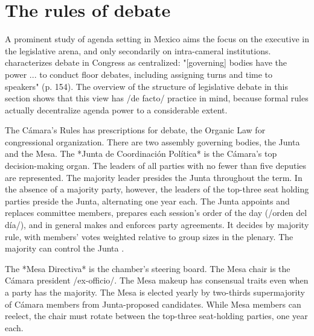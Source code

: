 \documentclass[letter,12pt]{article}
\begin{document}
\section{The rules of debate} %

A prominent study of agenda setting in Mexico aims the focus on the executive in the legislative arena, and only secondarily on intra-cameral institutions. \citet{casar.agsetting.2016} characterizes debate in Congress as centralized: "[governing] bodies have the power ... to conduct floor debates, including assigning turns and time to speakers" (p. 154). The overview of the structure of legislative debate in this section shows that this view has /de facto/ practice in mind, because formal rules actually decentralize agenda power to a considerable extent. 


The Cámara's Rules \citep{reglamentoDipMx.2019} has prescriptions for debate, the Organic Law \citep{loceum.2019} for congressional organization. There are two assembly governing bodies, the Junta and the Mesa. The *Junta de Coordinación Política* is the Cámara's top decision-making organ. The leaders of all parties with no fewer than five deputies are represented. The majority leader presides the Junta throughout the term. In the absence of a majority party, however, the leaders of the top-three seat holding parties preside the Junta, alternating one year each. The Junta appoints and replaces committee members, prepares each session's order of the day (/orden del día/), and in general makes and enforces party agreements. It decides by majority rule, with members' votes weighted relative to group sizes in the plenary. The majority can control the Junta \citep[cf.][]{cox.mccubbins.2005}.


The *Mesa Directiva* is the chamber's steering board. The Mesa chair is the Cámara president /ex-officio/. The Mesa makeup has consensual traits even when a party has the majority. The Mesa is elected yearly by two-thirds supermajority of Cámara members from Junta-proposed candidates. While Mesa members can reelect, the chair must rotate between the top-three seat-holding parties, one year each. 
\end{document}
